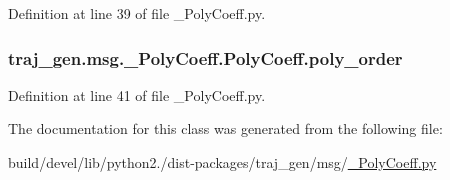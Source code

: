 Definition at line 39 of file \+\_\+\+Poly\+Coeff.\+py.

\subsubsection[{\texorpdfstring{poly\+\_\+order}{poly_order}}]{\setlength{\rightskip}{0pt plus 5cm}traj\+\_\+gen.\+msg.\+\_\+\+Poly\+Coeff.\+Poly\+Coeff.\+poly\+\_\+order}\hypertarget{classtraj__gen_1_1msg_1_1___poly_coeff_1_1_poly_coeff_a9a05bcf612b3bf2add175c6167faced5}{}\label{classtraj__gen_1_1msg_1_1___poly_coeff_1_1_poly_coeff_a9a05bcf612b3bf2add175c6167faced5}


Definition at line 41 of file \+\_\+\+Poly\+Coeff.\+py.



The documentation for this class was generated from the following file\+:\begin{DoxyCompactItemize}
\item 
build/devel/lib/python2./dist-\/packages/traj\+\_\+gen/msg/\hyperlink{___poly_coeff_8py}{\+\_\+\+Poly\+Coeff.\+py}\end{DoxyCompactItemize}
